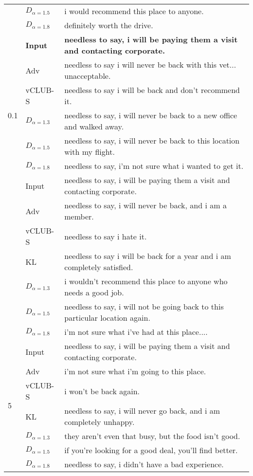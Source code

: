 \begin{longtable}[ht]{ll|l}
&$D_{\alpha=1.5}$  &  	i would recommend this place to anyone. \\
&$D_{\alpha=1.8}$  &  definitely worth the drive. \\\hline\hline
\multirow{7}{*}{0.1} &\textbf{Input}  & \textbf{needless to say, i will be paying them a visit and contacting corporate.}  \\\hline
&Adv  & needless to say i will never be back with this vet... unacceptable.   \\
&  vCLUB-S    &  needless to say i will be back and don't recommend it. \\
&$D_{\alpha=1.3}$  & needless to say, i will never be back to a new office and walked away. \\
&$D_{\alpha=1.5}$  & needless to say, i will never be back to this location with my flight. \\
&$D_{\alpha=1.8}$  & 	needless to say, i'm not sure what i wanted to get it. \\ \hline
\multirow{7}{*}{1} &Input  &  needless to say, i will be paying them a visit and contacting corporate. \\\hline
&Adv  &  	needless to say, i will never be back, and i am a member. \\
&  vCLUB-S    &  needless to say i hate it. \\
&KL  &  	needless to say i will be back for a year and i am completely satisfied. \\
&$D_{\alpha=1.3}$  & 	i wouldn't recommend this place to anyone who needs a good job. \\
&$D_{\alpha=1.5}$  &  needless to say, i will not be going back to this particular location again.\\
&$D_{\alpha=1.8}$  & 	i'm not sure what i've had at this place.... \\ \hline
\multirow{7}{*}{5} &Input  & needless to say, i will be paying them a visit and contacting corporate.  \\\hline
&Adv  &  	i'm not sure what i'm going to this place. \\
&  vCLUB-S    &  i won't be back again. \\
&KL  & 	needless to say, i will never go back, and i am completely unhappy.  \\
&$D_{\alpha=1.3}$  & 	they aren't even that busy, but the food isn't good. \\
&$D_{\alpha=1.5}$  & if you're looking for a good deal, you'll find better. \\
&$D_{\alpha=1.8}$  & 	needless to say, i didn't have a bad experience. \\ \hline

\end{longtable}
